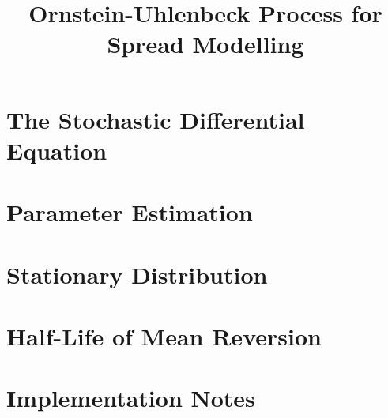 \documentclass[11pt]{article}
\title{Ornstein-Uhlenbeck Process for Spread Modelling}
\author{}
\date{}
\begin{document}
\maketitle


\section{The Stochastic Differential Equation}

\section{Parameter Estimation}

\section{Stationary Distribution}

\section{Half-Life of Mean Reversion}

\section{Implementation Notes}
\end{document}
